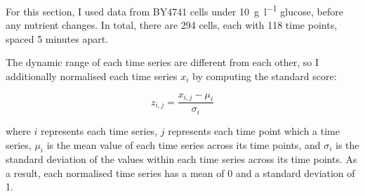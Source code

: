 
For this section, I used data from BY4741 cells under \SI{10}{\gram~\litre^{-1}} glucose, before any nutrient changes.
In total, there are 294 cells, each with 118 time points, spaced 5 minutes apart.




The dynamic range of each time series are different from each other, so I additionally normalised each time series $x_{i}$ by computing the standard score:

\begin{equation}
  \label{eq:analysis-stdscore}
  z_{i,j} = \frac{x_{i,j} - \mu_{i}}{\sigma_{i}}
\end{equation}

where $i$ represents each time series, $j$ represents each time point which a time series, $\mu_{i}$ is the mean value of each time series across its time points, and $\sigma_{i}$ is the standard deviation of the values within each time series across its time points.
As a result, each normalised time series has a mean of 0 and a standard deviation of 1.


